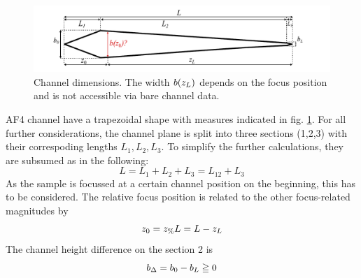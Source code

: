 \begin{figure}[H]  
  \begin{center}
    \includegraphics[width=\linewidth]{./images/fffChannelMeasures.pdf}    
  \end{center}
  \caption[Channel dimensions]{Channel dimensions. The width $b(z_L)$ depends on the focus position and is not accessible via bare channel data.}
  \label{fig:fffChannelMeasures} 
\end{figure}AF4 channel have a trapezoidal shape with measures indicated in fig. \ref{fig:fffChannelMeasures}.
For all further considerations, the channel plane is split into three sections (1,2,3) with their correspoding lengths $L_1, L_2, L_3$. To simplify the further calculations, they are subsumed as in the following:
\begin{equation}
  L
  = L_1 + L_2 + L_3 = L_{12} + L_3   
\end{equation}
As the sample is focussed at a certain channel position on the beginning, this has to be considered. The relative focus position \zP is related to the other focus-related magnitudes by
\begin{equation}
  z_0 = z_\text{\%} L = L - z_L
\end{equation}
The channel height difference \bDelta on the section 2 is
\begin{equation}
  b_\Delta = b_0 - b_L \geqq 0
\end{equation}

